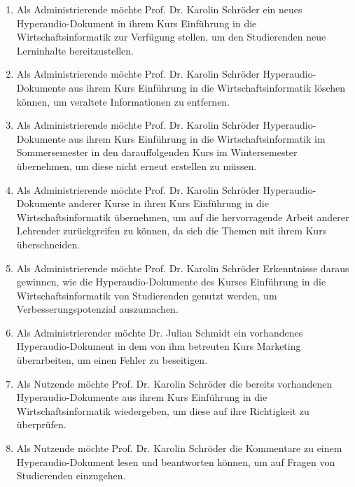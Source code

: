\begin{enumerate}[label=US-\arabic*:,ref=US-\arabic*]

\item \label{US-Admin-Erstellen} Als Administrierende möchte Prof. Dr. Karolin Schröder ein neues Hyperaudio-Dokument in ihrem Kurs \glqq Einführung in die Wirtschaftsinformatik\grqq{} zur Verfügung stellen, um den Studierenden neue Lerninhalte bereitzustellen.

\item \label{US-Admin-Loeschen} Als Administrierende möchte Prof. Dr. Karolin Schröder Hyperaudio-Dokumente aus ihrem Kurs \glqq Einführung in die Wirtschaftsinformatik\grqq{} löschen können, um veraltete Informationen zu entfernen.

\item \label{US-Admin-Semester} Als Administrierende möchte Prof. Dr. Karolin Schröder Hyperaudio-Dokumente aus ihrem Kurs \glqq Einführung in die Wirtschaftsinformatik\grqq{} im Sommersemester in den darauffolgenden Kurs im Wintersemester übernehmen, um diese nicht erneut erstellen zu müssen.

\item \label{US-Admin-Kurs} Als Administrierende möchte Prof. Dr. Karolin Schröder Hyperaudio-Dokumente anderer Kurse in ihren Kurs \glqq Einführung in die Wirtschaftsinformatik\grqq{} übernehmen, um auf die hervorragende Arbeit anderer Lehrender zurückgreifen zu können, da sich die Themen mit ihrem Kurs überschneiden.

\item \label{US-Admin-Statistik} Als Administrierende möchte Prof. Dr. Karolin Schröder Erkenntnisse daraus gewinnen, wie die Hyperaudio-Dokumente des Kurses \glqq Einführung in die Wirtschaftsinformatik\grqq{} von Studierenden genutzt werden, um Verbesserungspotenzial auszumachen.

\item \label{US-Admin-Bearbeiten} Als Administrierender möchte Dr. Julian Schmidt ein vorhandenes Hyperaudio-Dokument in dem von ihm betreuten Kurs \glqq Marketing\grqq{} überarbeiten, um einen Fehler zu beseitigen.

\item \label{US-Wiedergabe} Als Nutzende möchte Prof. Dr. Karolin Schröder die bereits vorhandenen Hyperaudio-Dokumente aus ihrem Kurs \glqq Einführung in die Wirtschaftsinformatik\grqq{} wiedergeben, um diese auf ihre Richtigkeit zu überprüfen.

\item \label{US-Antwort-L} Als Nutzende möchte Prof. Dr. Karolin Schröder die Kommentare zu einem Hyperaudio-Dokument lesen und beantworten können, um auf Fragen von Studierenden einzugehen.


\end{enumerate}
